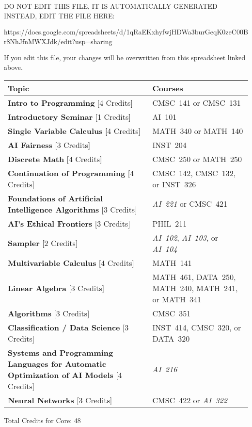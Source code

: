 
DO NOT EDIT THIS FILE, IT IS AUTOMATICALLY GENERATED
INSTEAD, EDIT THE FILE HERE:

https://docs.google.com/spreadsheets/d/1qRaEKxhyfwjHDWa3burGeqK0zeC00Br8NhJfnMWXJdk/edit?usp=sharing

If you edit this file, your changes will be overwritten from this spreadsheet
linked above.

\begin{longtable}{p{7cm}>{\raggedleft\arraybackslash}p{7cm}}
Topic & Courses \\
\toprule
\textbf{Intro to Programming} [4 Credits] & CMSC~141 or CMSC~131           \\
\textbf{Introductory Seminar} [1 Credits] & AI~101                         \\
\textbf{Single Variable Calculus} [4 Credits] & MATH~340 or MATH~140       \\
\textbf{AI Fairness} [3 Credits] & INST~204                                \\
\textbf{Discrete Math} [4 Credits] & CMSC~250 or MATH~250                  \\
\textbf{Continuation of Programming} [4 Credits] & CMSC~142, CMSC~132, or INST~326 \\
\textbf{Foundations of Artificial Intelligence Algorithms} [3 Credits] & \textit{AI~221} or CMSC~421 \\
\textbf{AI's Ethical Frontiers} [3 Credits] & PHIL~211                     \\
\textbf{Sampler} [2 Credits] & \textit{AI~102}, \textit{AI~103}, or \textit{AI~104} \\
\textbf{Multivariable Calculus} [4 Credits] & MATH~141                     \\
\textbf{Linear Algebra} [3 Credits] & MATH~461, DATA~250, MATH~240, MATH~241, or MATH~341 \\
\textbf{Algorithms} [3 Credits] & CMSC~351                                 \\
\textbf{Classification / Data Science} [3 Credits] & INST~414, CMSC~320, or DATA~320 \\
\textbf{Systems and Programming Languages for Automatic Optimization of AI Models} [4 Credits] & \textit{AI~216} \\
\textbf{Neural Networks} [3 Credits] & CMSC~422 or \textit{AI~322}         \\
\bottomrule
\end{longtable}
Total Credits for Core: 48

